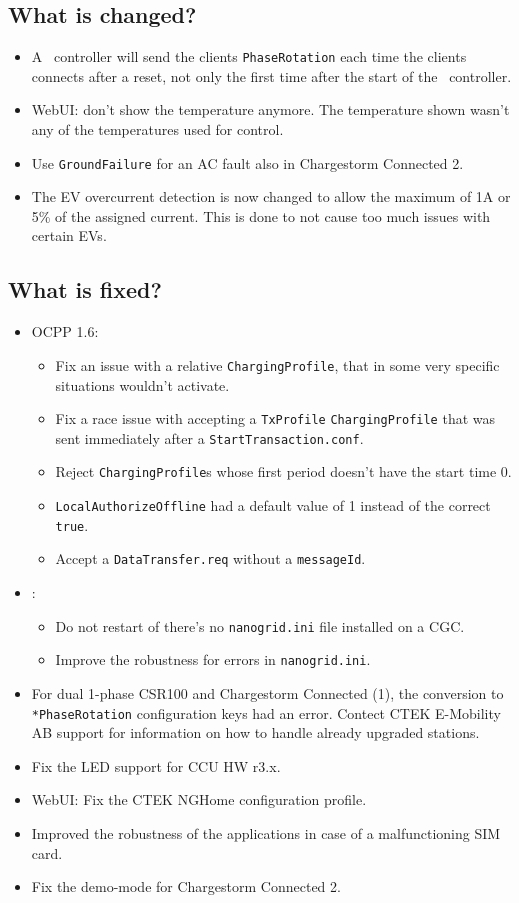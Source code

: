 \documentclass{scrartcl}
\begin{document}
\subsection*{What is changed?}
\begin{itemize}
\item A \nanogrid\ controller will send the clients \verb|PhaseRotation| each
  time the clients connects after a reset, not only the first time after the
  start of the \nanogrid\ controller.
\item WebUI: don't show the temperature anymore. The temperature shown wasn't
  any of the temperatures used for control.
\item Use \verb|GroundFailure| for an AC fault also in Chargestorm Connected
  2.
\item The EV overcurrent detection is now changed to allow the maximum of 1A
  or 5\% of the assigned current. This is done to not cause too much issues
  with certain EVs.
\end{itemize}
\subsection*{What is fixed?}
\begin{itemize}
\item OCPP 1.6:
  \begin{itemize}
  \item Fix an issue with a relative \verb|ChargingProfile|, that in some
    very specific situations wouldn't activate.
  \item Fix a race issue with accepting a \verb|TxProfile|
    \verb|ChargingProfile| that was sent immediately after a
    \verb|StartTransaction.conf|.
  \item Reject \verb|ChargingProfile|s whose first period doesn't have the
    start time 0.
  \item \verb|LocalAuthorizeOffline| had a default value of 1 instead of the
    correct \verb|true|.
  \item Accept a \verb|DataTransfer.req| without a \verb|messageId|.
  \end{itemize}
\item \nanogrid:
  \begin{itemize}
  \item Do not restart of there's no \verb|nanogrid.ini| file installed on a
    CGC.
  \item Improve the robustness for errors in \verb|nanogrid.ini|.
  \end{itemize}
\item For dual 1-phase CSR100 and Chargestorm Connected (1), the conversion to
  \verb|*PhaseRotation| configuration keys had an error. Contect CTEK
  E-Mobility AB support for information on how to handle already upgraded
  stations.
\item Fix the LED support for CCU HW r3.x.
\item WebUI: Fix the CTEK NGHome configuration profile.
\item Improved the robustness of the applications in case of a malfunctioning
  SIM card.
\item Fix the demo-mode for Chargestorm Connected 2.
\end{itemize}
\end{document}
